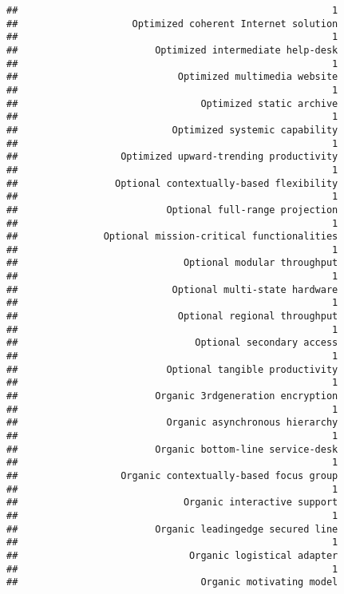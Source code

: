 \documentclass[
]{article}
\begin{document}
\begin{verbatim}
##                                                       1 
##                    Optimized coherent Internet solution 
##                                                       1 
##                        Optimized intermediate help-desk 
##                                                       1 
##                            Optimized multimedia website 
##                                                       1 
##                                Optimized static archive 
##                                                       1 
##                           Optimized systemic capability 
##                                                       1 
##                  Optimized upward-trending productivity 
##                                                       1 
##                 Optional contextually-based flexibility 
##                                                       1 
##                          Optional full-range projection 
##                                                       1 
##               Optional mission-critical functionalities 
##                                                       1 
##                             Optional modular throughput 
##                                                       1 
##                           Optional multi-state hardware 
##                                                       1 
##                            Optional regional throughput 
##                                                       1 
##                               Optional secondary access 
##                                                       1 
##                          Optional tangible productivity 
##                                                       1 
##                        Organic 3rdgeneration encryption 
##                                                       1 
##                          Organic asynchronous hierarchy 
##                                                       1 
##                        Organic bottom-line service-desk 
##                                                       1 
##                  Organic contextually-based focus group 
##                                                       1 
##                             Organic interactive support 
##                                                       1 
##                        Organic leadingedge secured line 
##                                                       1 
##                              Organic logistical adapter 
##                                                       1 
##                                Organic motivating model 

\end{verbatim}
\end{document}
